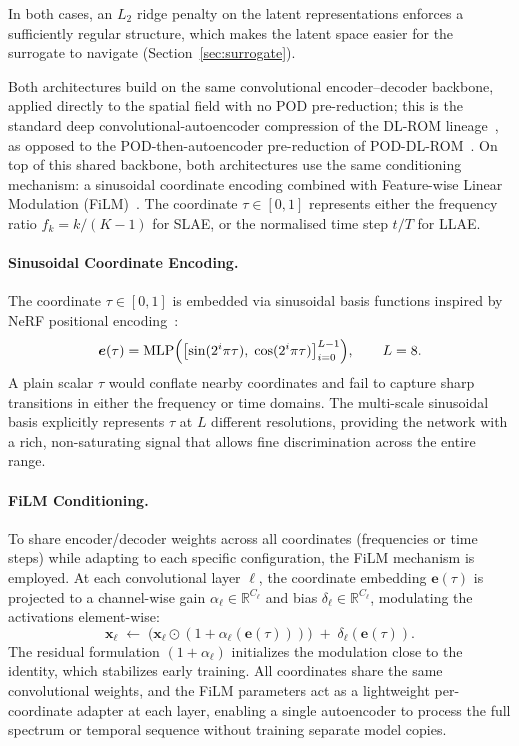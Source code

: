 ﻿\documentclass[a4paper,12pt]{article}
\theoremstyle{definition}
\theoremstyle{remark}
\newcommand{\R}{\mathbb{R}}
\begin{document}
In both cases, an $L_2$ ridge penalty on the latent representations enforces a sufficiently regular structure, which makes the latent space easier for the surrogate to navigate (Section~\ref{sec:surrogate}).

Both architectures build on the same convolutional encoder--decoder backbone, applied directly to the spatial field with no POD pre-reduction; this is the standard deep convolutional-autoencoder compression of the DL-ROM lineage~\cite{lee2020,fresca2021}, as opposed to the POD-then-autoencoder pre-reduction of POD-DL-ROM~\cite{fresca2022}. On top of this shared backbone, both architectures use the same conditioning mechanism: a sinusoidal coordinate encoding combined with Feature-wise Linear Modulation (FiLM)~\cite{perez2018film}. The coordinate $\tau \in [0,1]$ represents either the frequency ratio $f_k = k/(K-1)$ for SLAE, or the normalised time step $t/T$ for LLAE.

\paragraph{Sinusoidal Coordinate Encoding.}
The coordinate $\tau \in [0,1]$ is embedded via sinusoidal basis functions inspired by NeRF positional encoding~\cite{mildenhall2020nerf}:
\begin{equation}
    \bm{e}(\tau) = \mathrm{MLP}\Bigl(\bigl[\sin(2^i\pi \tau),\; \cos(2^i\pi \tau)\bigr]_{i=0}^{L-1}\Bigr), \qquad L = 8.
    \label{eq:posenc}
\end{equation}
A plain scalar $\tau$ would conflate nearby coordinates and fail to capture sharp transitions in either the frequency or time domains. The multi-scale sinusoidal basis explicitly represents $\tau$ at $L$ different resolutions, providing the network with a rich, non-saturating signal that allows fine discrimination across the entire range.

\paragraph{FiLM Conditioning.}
To share encoder/decoder weights across all coordinates (frequencies or time steps) while adapting to each specific configuration, the FiLM mechanism is employed. At each convolutional layer $\ell$, the coordinate embedding $\bm{e}(\tau)$ is projected to a channel-wise gain $\alpha_\ell \in \R^{C_\ell}$ and bias $\delta_\ell \in \R^{C_\ell}$, modulating the activations element-wise:
\begin{equation}
    \bm{x}_\ell \;\leftarrow\; \bigl(\bm{x}_\ell \odot (1 + \alpha_\ell(\bm{e}(\tau)))\bigr) \;+\; \delta_\ell(\bm{e}(\tau)).
    \label{eq:film}
\end{equation}
The residual formulation $(1 + \alpha_\ell)$ initializes the modulation close to the identity, which stabilizes early training. All coordinates share the same convolutional weights, and the FiLM parameters act as a lightweight per-coordinate adapter at each layer, enabling a single autoencoder to process the full spectrum or temporal sequence without training separate model copies.
\end{document}
